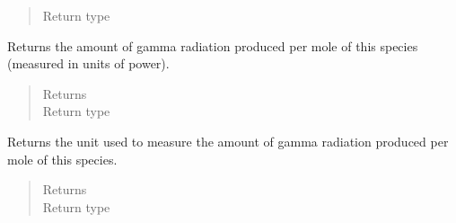 \documentclass[letterpaper,10pt,openany,oneside,english]{sphinxmanual}
\begin{document}
\begin{fulllineitems}
\begin{fulllineitems}
\begin{quote}
\begin{description}
\item[{Return type}] \leavevmode
{}

\end{description}\end{quote}

\end{fulllineitems}


\begin{fulllineitems}
\label{\detokenize{support_rst/specie:specie.Specie.GetMolarGammaPwr}}
Returns the amount of gamma radiation produced per mole of this species
(measured in units of power).
\begin{quote}\begin{description}
\item[{Returns}] \leavevmode
{}

\item[{Return type}] \leavevmode
{}

\end{description}\end{quote}

\end{fulllineitems}


\begin{fulllineitems}
\label{\detokenize{support_rst/specie:specie.Specie.GetMolarGammaPwrUnit}}
Returns the unit used to measure the amount of gamma radiation produced
per mole of this species.
\begin{quote}\begin{description}
\item[{Returns}] \leavevmode
{}

\item[{Return type}] \leavevmode
{}

\end{description}\end{quote}

\end{fulllineitems}


\end{fulllineitems}
\end{document}
